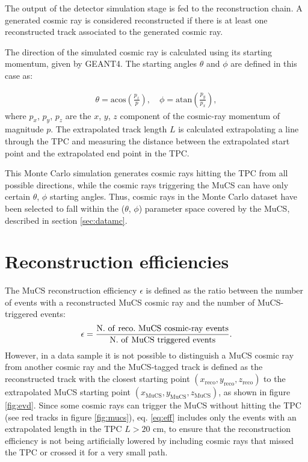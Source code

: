 \documentclass[a4paper,11pt]{article}
\def\myhyphen{{\hbox{-}}}
\begin{document}
The output of the detector simulation stage is fed to the reconstruction chain. A generated cosmic ray is considered reconstructed if there is at least one reconstructed track associated to the generated cosmic ray.

The direction of the simulated cosmic ray is calculated using its starting momentum, given by GEANT4. The starting angles $\theta$ and $\phi$ are defined in this case as:

\begin{align}\label{eq:angles}
  \theta = \mathrm{acos}\left(\frac{p_{z}}{p}\right), \quad
  \phi = \mathrm{atan}\left(\frac{p_{y}}{p_{x}}\right),
\end{align}
where $p_{x}$, $p_{y}$, $p_{z}$ are the $x$, $y$, $z$ component of the cosmic-ray momentum of magnitude $p$.
The extrapolated track length $L$ is calculated extrapolating a line through the TPC and measuring the distance between the extrapolated start point and the extrapolated end point in the TPC.

This Monte Carlo simulation generates cosmic rays hitting the TPC from all possible directions, while the cosmic rays triggering the MuCS can have only certain $\theta$, $\phi$ starting angles. Thus, cosmic rays in the Monte Carlo dataset have been selected to fall within the ($\theta$, $\phi$) parameter space covered by the MuCS, described in section \ref{sec:datamc}.


\section{Reconstruction efficiencies}\label{sec:reco}

The MuCS reconstruction efficiency $\epsilon$ is defined as the ratio between the number of events with a reconstructed MuCS cosmic ray and the number of MuCS-triggered events:
\begin{equation}\label{eq:eff}
  \epsilon = \frac{\mathrm{N.~of~reco.~MuCS~cosmic\myhyphen ray~events}}{\mathrm{N.~of~MuCS~triggered~events}}.
\end{equation}
However, in a data sample it is not possible to distinguish a MuCS cosmic ray from another cosmic ray and the MuCS-tagged track is defined as the reconstructed track with the closest starting point $(x_{\mathrm{reco}},y_{\mathrm{reco}},z_{\mathrm{reco}})$ to the extrapolated MuCS starting point $(x_{\mathrm{MuCS}},y_{\mathrm{MuCS}},z_{\mathrm{MuCS}})$, as shown in figure \ref{fig:evd}. Since some cosmic rays can trigger the MuCS without hitting the TPC (see red tracks in figure \ref{fig:mucs}), eq. \eqref{eq:eff} includes only the events with an extrapolated length in the TPC $L > 20$ cm, to ensure that the reconstruction efficiency is not being artificially lowered by including cosmic rays that missed the TPC or crossed it for a very small path.
\end{document}
